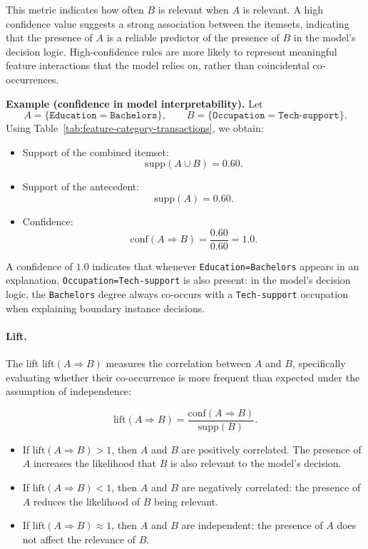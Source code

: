 This metric indicates how often $B$ is relevant when $A$ is relevant. A high confidence value suggests a strong association between the itemsets, indicating that the presence of $A$ is a reliable predictor of the presence of $B$ in the model's decision logic. High-confidence rules are more likely to represent meaningful feature interactions that the model relies on, rather than coincidental co-occurrences.

\noindent\textbf{Example (confidence in model interpretability).} Let
\[
  A = \{\texttt{Education}=\texttt{Bachelors}\}, \qquad B = \{\texttt{Occupation}=\texttt{Tech-support}\}.
\]
Using Table~\ref{tab:feature-category-transactions}, we obtain:

\begin{itemize}
  \item Support of the combined itemset: \[\mathrm{supp}(A \cup B) = 0.60.\]
  \item Support of the antecedent: \[\mathrm{supp}(A) = 0.60.\]
  \item Confidence: \[\mathrm{conf}(A \Rightarrow B) = \frac{0.60}{0.60} = 1.0.\]
\end{itemize}

A confidence of $1.0$ indicates that whenever \texttt{Education=Bachelors} appears in an explanation, \texttt{Occupation=Tech-support} is also present: in the model's decision logic, the \texttt{Bachelors} degree always co-occurs with a \texttt{Tech-support} occupation when explaining boundary instance decisions.

\paragraph{Lift.} The lift $\mathrm{lift}(A \Rightarrow B)$ measures the correlation between $A$ and $B$, specifically evaluating whether their co-occurrence is more frequent than expected under the assumption of independence:

\begin{equation}
  \mathrm{lift}(A \Rightarrow B) = \frac{\mathrm{conf}(A \Rightarrow B)}{\mathrm{supp}(B)}.
\end{equation}

\begin{itemize}
  \item If $\mathrm{lift}(A \Rightarrow B) > 1$, then $A$ and $B$ are positively correlated. The presence of $A$ increases the likelihood that $B$ is also relevant to the model's decision.
  \item If $\mathrm{lift}(A \Rightarrow B) < 1$, then $A$ and $B$ are negatively correlated: the presence of $A$ reduces the likelihood of $B$ being relevant.
  \item If $\mathrm{lift}(A \Rightarrow B) \approx 1$, then $A$ and $B$ are independent: the presence of $A$ does not affect the relevance of $B$.
\end{itemize}

